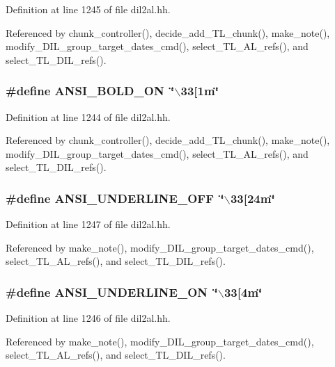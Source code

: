 Definition at line 1245 of file dil2al.hh.

Referenced by chunk\_\-controller(), decide\_\-add\_\-TL\_\-chunk(), make\_\-note(), modify\_\-DIL\_\-group\_\-target\_\-dates\_\-cmd(), select\_\-TL\_\-AL\_\-refs(), and select\_\-TL\_\-DIL\_\-refs().
\subsubsection{\setlength{\rightskip}{0pt plus 5cm}\#define ANSI\_\-BOLD\_\-ON\ \char`\"{}$\backslash$33[1m\char`\"{}}\label{dil2al_8hh_a91}




Definition at line 1244 of file dil2al.hh.

Referenced by chunk\_\-controller(), decide\_\-add\_\-TL\_\-chunk(), make\_\-note(), modify\_\-DIL\_\-group\_\-target\_\-dates\_\-cmd(), select\_\-TL\_\-AL\_\-refs(), and select\_\-TL\_\-DIL\_\-refs().
\subsubsection{\setlength{\rightskip}{0pt plus 5cm}\#define ANSI\_\-UNDERLINE\_\-OFF\ \char`\"{}$\backslash$33[24m\char`\"{}}\label{dil2al_8hh_a94}




Definition at line 1247 of file dil2al.hh.

Referenced by make\_\-note(), modify\_\-DIL\_\-group\_\-target\_\-dates\_\-cmd(), select\_\-TL\_\-AL\_\-refs(), and select\_\-TL\_\-DIL\_\-refs().
\subsubsection{\setlength{\rightskip}{0pt plus 5cm}\#define ANSI\_\-UNDERLINE\_\-ON\ \char`\"{}$\backslash$33[4m\char`\"{}}\label{dil2al_8hh_a93}




Definition at line 1246 of file dil2al.hh.

Referenced by make\_\-note(), modify\_\-DIL\_\-group\_\-target\_\-dates\_\-cmd(), select\_\-TL\_\-AL\_\-refs(), and select\_\-TL\_\-DIL\_\-refs().
